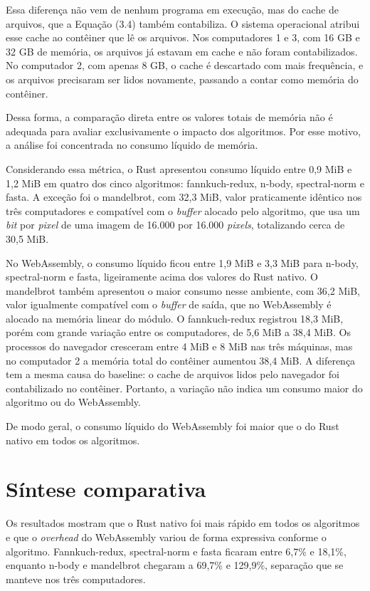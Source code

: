 Essa diferença não vem de nenhum programa em execução, mas do cache de arquivos, que a Equação (3.4) também contabiliza. O sistema operacional atribui esse cache ao contêiner que lê os arquivos. Nos computadores 1 e 3, com 16 GB e 32 GB de memória, os arquivos já estavam em cache e não foram contabilizados. No computador 2, com apenas 8 GB, o cache é descartado com mais frequência, e os arquivos precisaram ser lidos novamente, passando a contar como memória do contêiner.

Dessa forma, a comparação direta entre os valores totais de memória não é adequada para avaliar exclusivamente o impacto dos algoritmos. Por esse motivo, a análise foi concentrada no consumo líquido de memória.

Considerando essa métrica, o Rust apresentou consumo líquido entre 0,9 MiB e 1,2 MiB em quatro dos cinco algoritmos: fannkuch-redux, n-body, spectral-norm e fasta. A exceção foi o mandelbrot, com 32,3 MiB, valor praticamente idêntico nos três computadores e compatível com o \emph{buffer} alocado pelo algoritmo, que usa um \emph{bit} por \emph{pixel} de uma imagem de 16.000 por 16.000 \emph{pixels}, totalizando cerca de 30,5 MiB.

No WebAssembly, o consumo líquido ficou entre 1,9 MiB e 3,3 MiB para n-body, spectral-norm e fasta, ligeiramente acima dos valores do Rust nativo. O mandelbrot também apresentou o maior consumo nesse ambiente, com 36,2 MiB, valor igualmente compatível com o \emph{buffer} de saída, que no WebAssembly é alocado na memória linear do módulo. O fannkuch-redux registrou 18,3 MiB, porém com grande variação entre os computadores, de 5,6 MiB a 38,4 MiB. Os processos do navegador cresceram entre 4 MiB e 8 MiB nas três máquinas, mas no computador 2 a memória total do contêiner aumentou 38,4 MiB. A diferença tem a mesma causa do baseline: o cache de arquivos lidos pelo navegador foi contabilizado no contêiner. Portanto, a variação não indica um consumo maior do algoritmo ou do WebAssembly.

De modo geral, o consumo líquido do WebAssembly foi maior que o do Rust nativo em todos os algoritmos.

\section{Síntese comparativa}

Os resultados mostram que o Rust nativo foi mais rápido em todos os algoritmos e que o \emph{overhead} do WebAssembly variou de forma expressiva conforme o algoritmo. Fannkuch-redux, spectral-norm e fasta ficaram entre 6,7\% e 18,1\%, enquanto n-body e mandelbrot chegaram a 69,7\% e 129,9\%, separação que se manteve nos três computadores.

